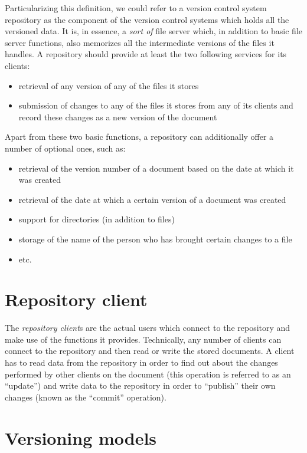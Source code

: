 Particularizing this definition, we could refer to a version control system repository as the
component of the version control systems which holds all the versioned data. It is, in essence, a
\emph{sort of} file server which, in addition to basic file server functions, also memorizes
all the intermediate versions of the files it handles. A repository should provide at least
the two following services for its clients:

\begin{itemize}
\item retrieval of any version of any of the files it stores
\item submission of changes to any of the files it stores from any of its clients and record
      these changes as a new version of the document
\end{itemize}

Apart from these two basic functions, a repository can additionally offer a number of optional
ones, such as:

\begin{itemize}
\item retrieval of the version number of a document based on the date at which it was created
\item retrieval of the date at which a certain version of a document was created
\item support for directories (in addition to files)
\item storage of the name of the person who has brought certain changes to a file
\item etc.
\end{itemize}

\section{Repository client}

The \emph{repository client}s are the actual users which connect to the repository and make
use of the functions it provides. Technically, any number of clients can connect to the
repository and then read or write the stored documents. A client has to read data
from the repository in order to find out about the changes performed by other
clients on the document (this operation is referred to as an  ``update'')
and write data to the repository in order to ``publish'' their own changes (known
as the ``commit'' operation).

\section{Versioning models}

